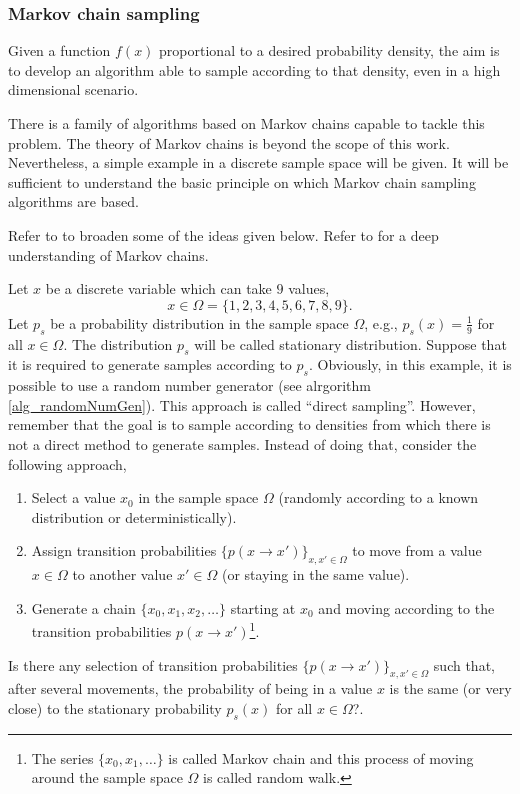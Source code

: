\subsubsection{Markov chain sampling} \label{sec_markovChain}

Given a function $f(x)$ proportional to a desired probability density, the aim is to develop an algorithm able to sample according to that density, even in a high dimensional scenario.

There is a family of algorithms based on Markov chains capable to tackle this problem. The theory of Markov chains is beyond the scope of this work. Nevertheless, a simple example in a discrete sample space will be given. It will be sufficient to understand the basic principle on which Markov chain sampling algorithms are based. 

Refer to \textcite{krauth2006} to broaden some of the ideas given below. Refer to \textcite{robert2004} for a deep understanding of Markov chains.

Let $x$ be a discrete variable which can take $9$ values,
$$
  x \in \Omega = \{1,2,3,4,5,6,7,8,9\}.
$$
Let $p_s$ be a probability distribution in the sample space $\Omega$, e.g.,
$p_s(x) = \frac{1}{9}$ for all $x\in\Omega$.
The distribution $p_s$ will be called stationary distribution. 
Suppose that it is required to generate samples according to $p_s$.
Obviously, in this example, it is possible to use a random number generator (see alrgorithm \ref{alg_randomNumGen}). This approach is called ``direct sampling''. However, remember that the goal is to sample according to densities from which there is not a direct method to generate samples. Instead of doing that, consider the following approach, 
\begin{enumerate}
  \item Select a value $x_0$ in the sample space $\Omega$ (randomly according to a known distribution or deterministically).
  \item Assign transition probabilities $\{p(x \rightarrow x')\}_{x,x' \in \Omega}$ to move from a value $x \in \Omega$ to another value $x' \in \Omega$ (or staying in the same value).
  \item Generate a chain $\{x_0, x_1, x_2, \dots\}$ starting at $x_0$ and moving according to the transition probabilities $p(x \rightarrow x')$\footnote{The series $\{x_0, x_1, \dots \}$ is called Markov chain and this process of moving around the sample space $\Omega$ is called random walk.}.
\end{enumerate}
Is there any selection of transition probabilities $\{p(x \rightarrow x')\}_{x,x' \in \Omega}$ such that, after several movements, the probability of being in a value $x$ is the same (or very close) to the stationary probability $p_s(x)$ for all $x \in \Omega$?. 

